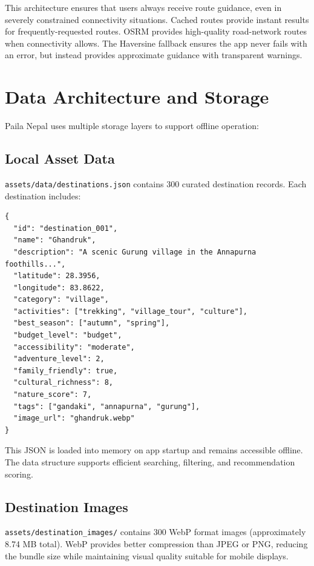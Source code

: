\documentclass[12pt,a4paper,oneside]{report}
\begin{document}
This architecture ensures that users always receive route guidance, even in severely constrained connectivity situations. Cached routes provide instant results for frequently-requested routes. OSRM provides high-quality road-network routes when connectivity allows. The Haversine fallback ensures the app never fails with an error, but instead provides approximate guidance with transparent warnings.

\section{Data Architecture and Storage}
\label{sec:data_arch}

Paila Nepal uses multiple storage layers to support offline operation:

\subsection{Local Asset Data}

\texttt{assets/data/destinations.json} contains 300 curated destination records. Each destination includes:

\begin{lstlisting}
{
  "id": "destination_001",
  "name": "Ghandruk",
  "description": "A scenic Gurung village in the Annapurna foothills...",
  "latitude": 28.3956,
  "longitude": 83.8622,
  "category": "village",
  "activities": ["trekking", "village_tour", "culture"],
  "best_season": ["autumn", "spring"],
  "budget_level": "budget",
  "accessibility": "moderate",
  "adventure_level": 2,
  "family_friendly": true,
  "cultural_richness": 8,
  "nature_score": 7,
  "tags": ["gandaki", "annapurna", "gurung"],
  "image_url": "ghandruk.webp"
}
\end{lstlisting}

This JSON is loaded into memory on app startup and remains accessible offline. The data structure supports efficient searching, filtering, and recommendation scoring.

\subsection{Destination Images}

\texttt{assets/destination\_images/} contains 300 WebP format images (approximately 8.74 MB total). WebP provides better compression than JPEG or PNG, reducing the bundle size while maintaining visual quality suitable for mobile displays.
\end{document}
